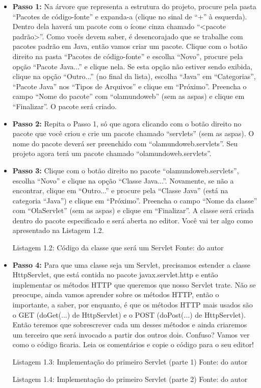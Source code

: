 \begin{itemize}
    \item \textbf{Passo 1:} Na árvore que representa a estrutura do projeto, procure pela pasta ``Pacotes de código-fonte'' e expanda-a (clique no sinal de ``+'' à esquerda). Dentro dela haverá um pacote com o ícone cinza chamado ``<pacote padrão>''. Como vocês devem saber, é desencorajado que se trabalhe com pacotes padrão em Java, então vamos criar um pacote. Clique com o botão direito na pasta ``Pacotes de código-fonte'' e escolha ``Novo'', procure pela opção ``Pacote Java...'' e clique nela. Se esta opção não estiver sendo exibida, clique na opção ``Outro...'' (no final da lista), escolha ``Java'' em ``Categorias'', ``Pacote Java'' nos ``Tipos de Arquivos'' e clique em ``Próximo''. Preencha o campo ``Nome do pacote'' com ``olamundoweb'' (sem as aspas) e clique em ``Finalizar''. O pacote será criado.
    
    \item \textbf{Passo 2:} Repita o Passo 1, só que agora clicando com o botão direito no pacote que você criou e crie um pacote chamado ``servlets'' (sem as aspas). O nome do pacote deverá ser preenchido com ``olamundoweb.servlets''. Seu projeto agora terá um pacote chamado ``olamundoweb.servlets''.
    
    \item \textbf{Passo 3:} Clique com o botão direito no pacote ``olamundoweb.servlets'', escolha ``Novo'' e clique na opção ``Classe Java...''. Novamente, se não a encontrar, clique em ``Outro...'' e procure pela ``Classe Java'' (está na categoria ``Java'') e clique em ``Próximo''. Preencha o campo ``Nome da classe'' com ``OlaServlet'' (sem as aspas) e clique em ``Finalizar''. A classe será criada dentro do pacote especificado e será aberta no editor. Você vai ter algo como apresentado na Listagem 1.2.
    
    Listagem 1.2: Código da classe que será um Servlet
    Fonte: do autor
    
    \item \textbf{Passo 4:} Para que uma classe seja um Servlet, precisamos estender a classe HttpServlet, que está contida no pacote javax.servlet.http e então implementar os métodos HTTP que queremos que nosso Servlet trate. Não se preocupe, ainda vamos aprender sobre os métodos HTTP, então o importante, a saber, por enquanto, é que os métodos HTTP mais usados são o GET (doGet(...) de HttpServlet) e o POST (doPost(...) de HttpServlet). Então teremos que sobrescrever cada um desses métodos e ainda criaremos um terceiro que será invocado a partir dos outros dois. Confuso? Vamos ver como o código ficaria. Leia os comentários e copie o código para o seu editor!
    
    Listagem 1.3: Implementação do primeiro Servlet (parte 1)
    Fonte: do autor
    
    Listagem 1.4: Implementação do primeiro Servlet (parte 2)
    Fonte: do autor
    
\end{itemize}

